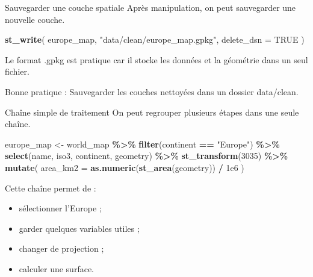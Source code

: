 \documentclass[
  10pt,
  ignorenonframetext,
]{beamer}
\newenvironment{Shaded}{\begin{snugshade}}{\end{snugshade}}
\newcommand{\AttributeTok}[1]{\textcolor[rgb]{0.13,0.29,0.53}{#1}}
\newcommand{\ConstantTok}[1]{\textcolor[rgb]{0.56,0.35,0.01}{#1}}
\newcommand{\DecValTok}[1]{\textcolor[rgb]{0.00,0.00,0.81}{#1}}
\newcommand{\FloatTok}[1]{\textcolor[rgb]{0.00,0.00,0.81}{#1}}
\newcommand{\FunctionTok}[1]{\textcolor[rgb]{0.13,0.29,0.53}{\textbf{#1}}}
\newcommand{\NormalTok}[1]{#1}
\newcommand{\OtherTok}[1]{\textcolor[rgb]{0.56,0.35,0.01}{#1}}
\newcommand{\SpecialCharTok}[1]{\textcolor[rgb]{0.81,0.36,0.00}{\textbf{#1}}}
\newcommand{\StringTok}[1]{\textcolor[rgb]{0.31,0.60,0.02}{#1}}
\begin{document}
\begin{frame}[fragile]{Sauvegarder une couche spatiale}
\label{sauvegarder-une-couche-spatiale}
Après manipulation, on peut sauvegarder une nouvelle couche.

\begin{Shaded}
\begin{Highlighting}[]
\FunctionTok{st\_write}\NormalTok{(}
\NormalTok{  europe\_map,}
  \StringTok{"data/clean/europe\_map.gpkg"}\NormalTok{,}
  \AttributeTok{delete\_dsn =} \ConstantTok{TRUE}
\NormalTok{)}
\end{Highlighting}
\end{Shaded}

Le format .gpkg est pratique car il stocke les données et la géométrie
dans un seul fichier.

Bonne pratique : Sauvegarder les couches nettoyées dans un dossier
data/clean.
\end{frame}

\begin{frame}[fragile]{Chaîne simple de traitement}
\label{chauxeene-simple-de-traitement}
On peut regrouper plusieurs étapes dans une seule chaîne.

\begin{Shaded}
\begin{Highlighting}[]
\NormalTok{europe\_map }\OtherTok{\textless{}{-}}\NormalTok{ world\_map }\SpecialCharTok{\%\textgreater{}\%}
  \FunctionTok{filter}\NormalTok{(continent }\SpecialCharTok{==} \StringTok{"Europe"}\NormalTok{) }\SpecialCharTok{\%\textgreater{}\%}
  \FunctionTok{select}\NormalTok{(name, iso3, continent, geometry) }\SpecialCharTok{\%\textgreater{}\%}
  \FunctionTok{st\_transform}\NormalTok{(}\DecValTok{3035}\NormalTok{) }\SpecialCharTok{\%\textgreater{}\%}
  \FunctionTok{mutate}\NormalTok{(}
    \AttributeTok{area\_km2 =} \FunctionTok{as.numeric}\NormalTok{(}\FunctionTok{st\_area}\NormalTok{(geometry)) }\SpecialCharTok{/} \FloatTok{1e6}
\NormalTok{  )}
\end{Highlighting}
\end{Shaded}

Cette chaîne permet de :

\begin{itemize}
\item sélectionner l’Europe ;
\item garder quelques variables utiles ;
\item changer de projection ;
\item calculer une surface.
\end{itemize}
\end{frame}
\end{document}

